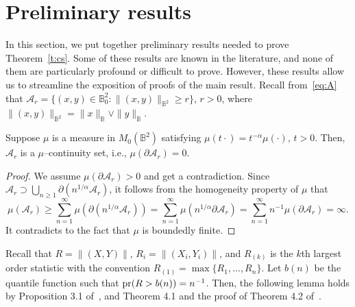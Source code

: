 \documentclass[lineno]{biometrika}
\newcommand \ag{\alpha}
\newcommand\mbB{{\mathbb B}}
\begin{document}
\appendix

\appendixone
\section{Preliminary results}\label{s:pre}

In this section, we put together preliminary results needed to prove Theorem~\ref{t:cs}. Some of these results are known in the literature, and none of them are particularly profound or difficult to prove. However, these results allow us to streamline the exposition of proofs of the main result. Recall from~\eqref{eq:A} that $\mathcal A_r =\{(x,y)\in \mbB_0^2: \|(x,y)\|_{\mbB^2}  \ge r\}$, $r>0$, where $\|(x,y)\|_{\mbB^2} = \|x\|_{\mbB} \vee \|y\|_{\mbB}$.


\begin{lemma} \label{l:mu-conti}
Suppose $\mu$ is a measure in $M_0(\mbB^2)$ satisfying $\mu(t\cdot)=t^{-\ag}\mu(\cdot)$, $t>0$.  Then, $\mathcal A_r$ is a $\mu$--continuity set, i.e., $\mu(\partial \mathcal A_r)=0$.
\end{lemma}

\begin{proof}
We assume $\mu(\partial{\mathcal A_r})>0$ and get a contradiction. Since ${\mathcal A_r}\supset \bigcup_{n\ge 1} \partial(n^{1/\ag}{\mathcal A_r})$, it follows from the homogeneity property of $\mu$ that
\[
\mu({\mathcal A_r}) \ge \sum_{n=1}^{\infty} \mu(\partial(n^{1/\ag}{\mathcal A_r})) = \sum_{n=1}^{\infty} \mu(n^{1/\ag}\partial{\mathcal A_r}) =\sum_{n=1}^{\infty} n^{-1}\mu(\partial{\mathcal A_r})=\infty.
\]
It contradicts to the fact that $\mu$ is boundedly finite.
\end{proof}





Recall that $R= \|(X, Y)\|$, $R_i = \|(X_i, Y_i)\|$, and $R_{(k)}$ is the $k$th largest order statistic with the convention $R_{(1)} = \max \{ R_1, \ldots, R_n \}$. Let $b(n)$ be the quantile function such that ${\rm pr}(R>b(n))=n^{-1}$. Then, the following lemma holds by Proposition 3.1 of~\citet{segers:zhao:meinguet:2017}, and Theorem 4.1 and the proof of Theorem 4.2 of~\citet{resnick:2007}.
\end{document}
